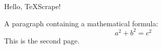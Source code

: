\hsize=4in
\vsize=5in
\def\greet#1{Hello, #1!}
\noindent \greet{TeXScrape}\par
A paragraph containing a mathematical formula:
$$a^2+b^2=c^2$$
\vfill\eject
This is the second page.\par
\bye
